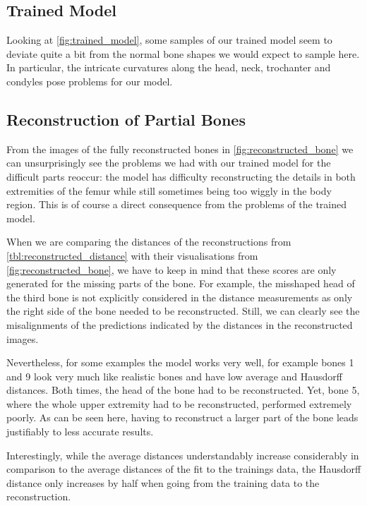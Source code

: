 \subsection{Trained Model}
\label{subsec:trainedmodeldisc}
Looking at \autoref{fig:trained_model}, some samples of our trained model seem to deviate quite a bit from the normal bone shapes we would expect to sample here. In particular, the intricate curvatures along the head, neck, trochanter and condyles pose problems for our model.


\subsection{Reconstruction of Partial Bones}
\label{subsec:reconresultsdisc}

From the images of the fully reconstructed bones in \autoref{fig:reconstructed_bone} we can unsurprisingly see the problems we had with our trained model for the difficult parts reoccur: the model has difficulty reconstructing the details in both extremities of the femur while still sometimes being too wiggly in the body region. This is of course a direct consequence from the problems of the trained model.

When we are comparing the distances of the reconstructions from \autoref{tbl:reconstructed_distance} with their visualisations from \autoref{fig:reconstructed_bone}, we have to keep in mind that these scores are only generated for the missing parts of the bone. For example, the misshaped head of the third bone is not explicitly considered in the distance measurements as only the right side of the bone needed to be reconstructed. Still, we can clearly see the misalignments of the predictions indicated by the distances in the reconstructed images.

Nevertheless, for some examples the model works very well, for example bones 1 and 9 look very much like realistic bones and have low average and Hausdorff distances. Both times, the head of the bone had to be reconstructed. Yet, bone 5, where the whole upper extremity had to be reconstructed, performed extremely poorly. As can be seen here, having to reconstruct a larger part of the bone leads justifiably to less accurate results.

Interestingly, while the average distances understandably increase considerably in comparison to the average distances of the fit to the trainings data, the Hausdorff distance only increases by half when going from the training data to the reconstruction.

